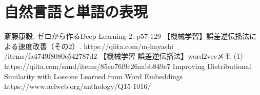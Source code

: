 \documentclass[twocolumn]{jarticle}
\begin{document}
\subsection{}

\section{自然言語と単語の表現}
\begin{thebibliography}{9}
   斎藤康穀. ゼロから作るDeep Learning 2. p57-129
   【機械学習】誤差逆伝播法による速度改善（その2）. https://qiita.com/m-hayashi\\/items/fa4749f8080e542787d2
   【機械学習 誤差逆伝播法】word2vecメモ (1) https://qiita.com/sand/items/85ea76f9c26aabb849e7
   Improving Distributional Similarity with Lossons Learned from Word Embeddings https://www.aclweb.org/anthology/Q15-1016/
\end{thebibliography}
\end{document}
